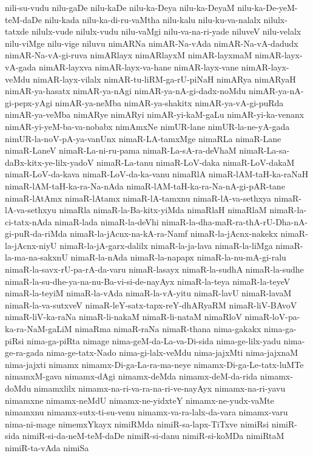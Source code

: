 {nili-su-vudu
nilu-gaDe
nilu-kaDe
nilu-ka-Deya
nilu-ka-DeyaM
nilu-ka-De-yeM-teM-daDe
nilu-kada
nilu-ka-di-ru-vaMtha
nilu-kalu
nilu-ku-va-nalalx
nilulx-tatxde
nilulx-vude
nilulx-vudu
nilu-vaMgi
nilu-va-na-ri-yade
niluveV
nilu-velalx
nilu-viMge
nilu-vige
niluvu
nimARNa
nimAR-Na-vAda
nimAR-Na-vA-dadudx
nimAR-Na-vA-gi-ruva
nimARlayx
nimARlayxM
nimAR-layxmaM
nimAR-layx-vA-gada
nimAR-layxva
nimAR-layx-va-hane
nimAR-layx-vane
nimAR-layx-veMdu
nimAR-layx-vilalx
nimAR-tu-liRM-ga-rU-piNaH
nimARya
nimARyaH
nimAR-ya-hasatx
nimAR-ya-nAgi
nimAR-ya-nA-gi-dadx-noMdu
nimAR-ya-nA-gi-pepx-yAgi
nimAR-ya-neMba
nimAR-ya-shakitx
nimAR-ya-vA-gi-puRda
nimAR-ya-veMba
nimARye
nimARyi
nimAR-yi-kaM-gaLu
nimAR-yi-ka-venanx
nimAR-yi-yeM-ba-va-nobabx
nimAmxNe
nimUR-lane
nimUR-la-ne-yA-gada
nimUR-la-noV-pA-ya-vanUnx
nimaR-LA-tamxMge
nimaRLa
nimaR-Lane
nimaR-LaneV
nimaR-La-ni-ru-pama
nimaR-La-sA-ra-deVhaM
nimaR-La-sa-daBx-kitx-ye-lilx-yadoV
nimaR-La-tanu
nimaR-LoV-daka
nimaR-LoV-dakaM
nimaR-LoV-da-kava
nimaR-LoV-da-ka-vanu
nimaRlA
nimaR-lAM-taH-ka-raNaH
nimaR-lAM-taH-ka-ra-Na-nAda
nimaR-lAM-taH-ka-ra-Na-nA-gi-pAR-tane
nimaR-lAtAmx
nimaR-lAtamx
nimaR-lA-tamxnu
nimaR-lA-va-sethxya
nimaR-lA-va-sethxyu
nimaRla
nimaR-la-Ba-kitx-yiMda
nimaRlaH
nimaRlaM
nimaR-la-ci-tatx-nAda
nimaR-lada
nimaR-la-deVhi
nimaR-la-dha-maR-ra-thA-rU-Dha-nA-gi-puR-da-riMda
nimaR-la-jAcnx-na-kA-ra-Namf
nimaR-la-jAcnx-nakekx
nimaR-la-jAcnx-niyU
nimaR-la-jA-garx-dalilx
nimaR-la-ja-lava
nimaR-la-liMga
nimaR-la-ma-na-sakxnU
nimaR-la-nAda
nimaR-la-napapx
nimaR-la-nu-mA-gi-ralu
nimaR-la-savx-rU-pa-rA-da-varu
nimaR-lasayx
nimaR-la-sudhA
nimaR-la-sudhe
nimaR-la-su-dhe-ya-na-nu-Ba-vi-si-de-nayAyx
nimaR-la-teya
nimaR-la-teyeV
nimaR-la-teyiM
nimaR-la-vAda
nimaR-la-vA-yitu
nimaR-lavU
nimaR-lavaM
nimaR-la-va-sutxveV
nimaR-leY-satx-tapx-reY-dhARyaRM
nimaR-liV-BAvoV
nimaR-liV-ka-raNa
nimaR-li-nakaM
nimaR-li-nataM
nimaRloV
nimaR-loV-pa-ka-ra-NaM-gaLiM
nimaRma
nimaR-raNa
nimaR-thana
nima-gakakx
nima-ga-piRsi
nima-ga-piRta
nimage
nima-geM-da-La-va-Di-sida
nima-ge-lilx-yadu
nima-ge-ra-gada
nima-ge-tatx-Nado
nima-gi-lalx-veMdu
nima-jajxMti
nima-jajxnaM
nima-jajxti
nimamx
nimamx-Di-ga-La-ra-ma-neye
nimamx-Di-ga-Le-tatx-luMTe
nimamxM-gava
nimamx-dAgi
nimamx-deMda
nimamx-deM-da-rida
nimamx-doMdu
nimamxlilx
nimamx-na-ri-va-ra-na-ri-ve-nayAyx
nimamx-na-ri-yavu
nimamxne
nimamx-neMdU
nimamx-ne-yidxteY
nimamx-ne-yudx-vaMte
nimamxnu
nimamx-sutx-ti-su-venu
nimamx-va-ra-lalx-da-vara
nimamx-varu
nima-ni-mage
nimemxYkayx
nimiRMda
nimiR-sa-lapx-TiTxve
nimiRsi
nimiR-sida
nimiR-si-da-neM-teM-daDe
nimiR-si-danu
nimiR-si-koMDa
nimiRtaM
nimiR-ta-vAda
nimiSa
}
